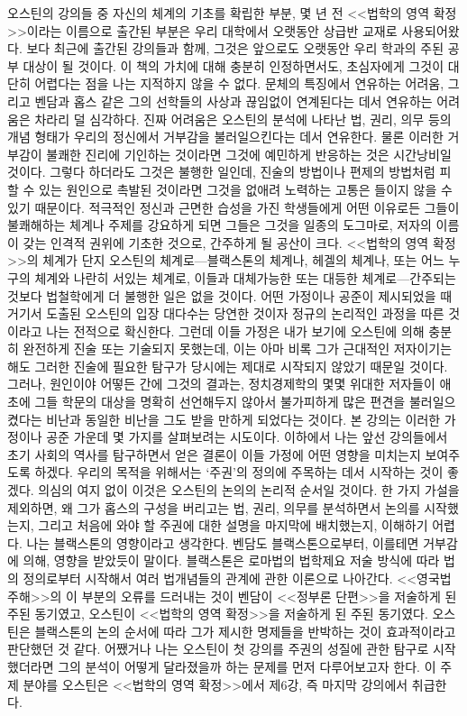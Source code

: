오스틴의 강의들 중
자신의 체계의 기초를 확립한 부분, 몇 년 전
<<법학의 영역 확정>>이라는 이름으로 출간된 부분은
우리 대학에서 오랫동안 상급반 교재로 사용되어왔다.
보다 최근에  출간된 강의들과 함께,
그것은 앞으로도 오랫동안 우리 학과의 주된 공부 대상이 될 것이다.
이 책의 가치에 대해 충분히 인정하면서도,
초심자에게 그것이 대단히 어렵다는 점을 나는 지적하지 않을 수 없다.
문체의 특징에서 연유하는 어려움,
그리고 벤담과 홉스 같은 그의 선학들의 사상과 끊임없이 연계된다는 데서
연유하는 어려움은 차라리 덜 심각하다.
진짜 어려움은 오스틴의 분석에 나타난 법, 권리, 의무 등의 개념 형태가
우리의 정신에서 거부감을 불러일으킨다는 데서 연유한다.
물론 이러한 거부감이 불쾌한 진리에 기인하는 것이라면
그것에 예민하게 반응하는 것은 시간낭비일 것이다.
그렇다 하더라도 그것은 불행한 일인데,
진술의 방법이나 편제의 방법처럼 피할 수 있는 원인으로 촉발된 것이라면
그것을 없애려 노력하는 고통은 들이지 않을 수 있기 때문이다.
적극적인 정신과 근면한 습성을 가진 학생들에게
어떤 이유로든 그들이 불쾌해하는 체계나 주제를 강요하게 되면
그들은 그것을 일종의 도그마로, 저자의 이름이 갖는 인격적 권위에 기초한 것으로,
간주하게 될 공산이 크다.
<<법학의 영역 확정>>의 체계가 단지 오스틴의 체계로---블랙스톤의
체계나, 헤겔의 체계나, 또는 어느 누구의 체계와 나란히 서있는 체계로,
이들과 대체가능한 또는 대등한 체계로---간주되는 것보다 법철학에게
더 불행한 일은 없을 것이다.
어떤 가정이나 공준이 제시되었을 때
거기서 도출된 오스틴의 입장 대다수는 당연한 것이자 정규의 논리적인 과정을
따른 것이라고 나는 전적으로 확신한다.
그런데
이들 가정은
내가 보기에
오스틴에 의해 충분히 완전하게 진술 또는 기술되지
못했는데, 이는 아마 비록 그가 근대적인 저자이기는 해도
그러한 진술에 필요한 탐구가 당시에는 제대로 시작되지 않았기 때문일 것이다.
그러나, 원인이야 어떻든 간에
그것의 결과는,
정치경제학의 몇몇 위대한 저자들이 애초에 그들 학문의 대상을
명확히 선언해두지 않아서 불가피하게 많은 편견을 불러일으켰다는 비난과
동일한 비난을 그도 받을 만하게 되었다는 것이다.
본 강의는 이러한 가정이나 공준 가운데 몇 가지를 살펴보려는 시도이다.
이하에서 나는 앞선 강의들에서
초기 사회의 역사를 탐구하면서
얻은 결론이 이들 가정에 어떤 영향을 미치는지 보여주도록 하겠다.
우리의 목적을 위해서는 `주권'의 정의에 주목하는 데서 시작하는 것이 좋겠다.
의심의 여지 없이 이것은 오스틴의 논의의 논리적 순서일 것이다.
한 가지 가설을 제외하면,
왜 그가 홉스의 구성을 버리고는 법, 권리, 의무를 분석하면서
논의를 시작했는지, 그리고 처음에 와야 할 주권에 대한 설명을
마지막에 배치했는지,
이해하기 어렵다.
나는 블랙스톤의 영향이라고 생각한다.
벤담도 블랙스톤으로부터, 이를테면 거부감에 의해, 영향을 받았듯이 말이다.
블랙스톤은 로마법의 법학제요 저술 방식에 따라
법의 정의로부터 시작해서 여러 법개념들의 관계에 관한 이론으로 나아간다.
<<영국법 주해>>의 이 부분의 오류를 드러내는 것이
벤담이 <<정부론 단편>>을 저술하게 된 주된 동기였고,
오스틴이 <<법학의 영역 확정>>을 저술하게 된 주된 동기였다.
오스틴은 블랙스톤의 논의 순서에 따라
그가 제시한 명제들을 반박하는 것이 효과적이라고 판단했던 것 같다.
어쨌거나
나는 오스틴이 첫 강의를 주권의 성질에 관한 탐구로 시작했더라면
그의 분석이 어떻게 달라졌을까 하는 문제를 먼저 다루어보고자 한다.
이 주제 분야를 오스틴은 <<법학의 영역 확정>>에서 제6강, 즉
마지막 강의에서 취급한다.

